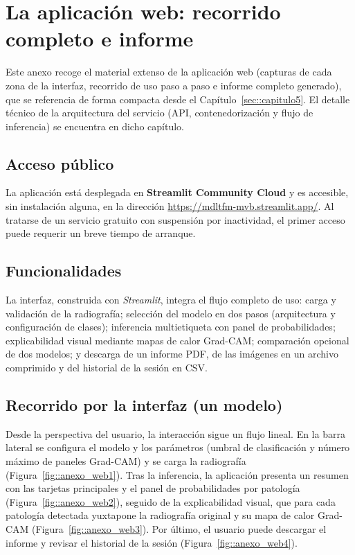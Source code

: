 %
\chapter{La aplicación web: recorrido completo e informe}
\label{anexo::web}

Este anexo recoge el material extenso de la aplicación web (capturas de cada zona de la
interfaz, recorrido de uso paso a paso e informe completo generado), que se referencia
de forma compacta desde el Capítulo~\ref{sec::capitulo5}. El detalle técnico de la
arquitectura del servicio (API, contenedorización y flujo de inferencia) se encuentra en
dicho capítulo.

\section{Acceso público}
\label{anexo::web_acceso}

La aplicación está desplegada en \textbf{Streamlit Community Cloud} y es accesible, sin
instalación alguna, en la dirección \url{https://mdltfm-mvb.streamlit.app/}. Al tratarse
de un servicio gratuito con suspensión por inactividad, el primer acceso puede requerir
un breve tiempo de arranque.

\section{Funcionalidades}
\label{anexo::web_funcionalidades}

La interfaz, construida con \textit{Streamlit}, integra el flujo completo de uso: carga y
validación de la radiografía; selección del modelo en dos pasos (arquitectura y
configuración de clases); inferencia multietiqueta con panel de probabilidades;
explicabilidad visual mediante mapas de calor Grad-CAM; comparación opcional de dos
modelos; y descarga de un informe PDF, de las imágenes en un archivo comprimido y del
historial de la sesión en CSV.

\section{Recorrido por la interfaz (un modelo)}
\label{anexo::web_recorrido}

Desde la perspectiva del usuario, la interacción sigue un flujo lineal. En la barra
lateral se configura el modelo y los parámetros (umbral de clasificación y número máximo
de paneles Grad-CAM) y se carga la radiografía (Figura~\ref{fig::anexo_web1}). Tras la
inferencia, la aplicación presenta un resumen con las tarjetas principales y el panel de
probabilidades por patología (Figura~\ref{fig::anexo_web2}), seguido de la explicabilidad
visual, que para cada patología detectada yuxtapone la radiografía original y su mapa de
calor Grad-CAM (Figura~\ref{fig::anexo_web3}). Por último, el usuario puede descargar el
informe y revisar el historial de la sesión (Figura~\ref{fig::anexo_web4}).

